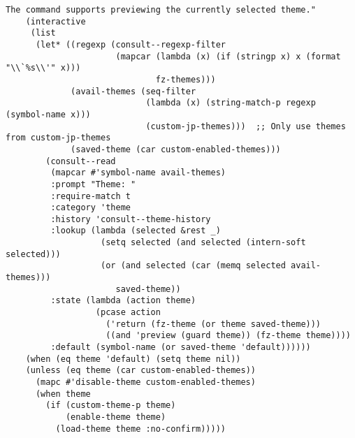 \documentclass[11pt]{article}
\begin{document}
\begin{verbatim}
The command supports previewing the currently selected theme."
    (interactive
     (list
      (let* ((regexp (consult--regexp-filter
                      (mapcar (lambda (x) (if (stringp x) x (format "\\`%s\\'" x)))
                              fz-themes)))
             (avail-themes (seq-filter
                            (lambda (x) (string-match-p regexp (symbol-name x)))
                            (custom-jp-themes)))  ;; Only use themes from custom-jp-themes
             (saved-theme (car custom-enabled-themes)))
        (consult--read
         (mapcar #'symbol-name avail-themes)
         :prompt "Theme: "
         :require-match t
         :category 'theme
         :history 'consult--theme-history
         :lookup (lambda (selected &rest _)
                   (setq selected (and selected (intern-soft selected)))
                   (or (and selected (car (memq selected avail-themes)))
                      saved-theme))
         :state (lambda (action theme)
                  (pcase action
                    ('return (fz-theme (or theme saved-theme)))
                    ((and 'preview (guard theme)) (fz-theme theme))))
         :default (symbol-name (or saved-theme 'default))))))
    (when (eq theme 'default) (setq theme nil))
    (unless (eq theme (car custom-enabled-themes))
      (mapc #'disable-theme custom-enabled-themes)
      (when theme
        (if (custom-theme-p theme)
            (enable-theme theme)
          (load-theme theme :no-confirm)))))
\end{verbatim}
\end{document}
